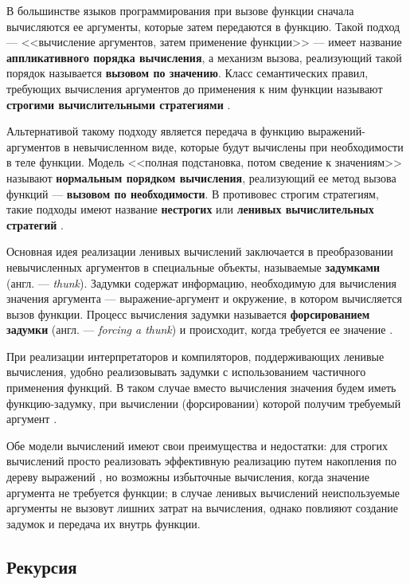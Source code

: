 В большинстве языков программирования при вызове функции сначала вычисляются
ее аргументы, которые затем передаются в функцию. Такой подход
--- <<вычисление аргументов, затем применение функции>> ---
имеет название \textbf{аппликативного порядка вычисления}, а механизм вызова,
реализующий такой порядок называется \textbf{вызовом по значению}. Класс
семантических правил, требующих вычисления аргументов до применения к ним
функции называют \textbf{строгими вычислительными стратегиями} \cite[с.~71]{fp93}.

Альтернативой такому подходу является передача в функцию выражений-аргументов
в невычисленном виде, которые будут вычислены при необходимости в теле
функции. Модель <<полная подстановка, потом сведение к значениям>> называют
\textbf{нормальным порядком вычисления}, реализующий ее метод вызова функций
--- \textbf{вызовом по необходимости}. В противовес строгим стратегиям,
такие подходы имеют название \textbf{нестрогих} или \textbf{ленивых вычислительных
стратегий} \cite[с.~32]{sicp}\cite[с.~370]{sicp}.

Основная идея реализации ленивых вычислений заключается в преобразовании
невычисленных аргументов в специальные объекты, называемые \textbf{задумками}
(англ. --- \textit{thunk}). Задумки содержат информацию, необходимую для
вычисления значения аргумента --- выражение-аргумент и окружение, в котором
вычисляется вызов функции. Процесс вычисления задумки называется
\textbf{форсированием задумки} (англ. --- \textit{forcing a thunk}) и происходит, когда требуется ее значение \cite[с.~372]{sicp}.

При реализации интерпретаторов и компиляторов, поддерживающих ленивые вычисления,
удобно реализовывать задумки с использованием частичного применения функций.
В таком случае вместо вычисления значения будем иметь функцию-задумку,
при вычислении (форсировании) которой получим требуемый аргумент \cite[с.~375]{sicp}.

Обе модели вычислений имеют свои преимущества и недостатки: для строгих
вычислений просто реализовать эффективную реализацию путем накопления по
дереву выражений \cite[с.~29]{sicp}, но возможны избыточные вычисления,
когда значение аргумента не требуется функции; в случае ленивых вычислений
неиспользуемые аргументы не вызовут лишних затрат на вычисления, однако
повлияют создание задумок и передача их внутрь функции.

\subsection{Рекурсия}\label{sec:ch1/sec3/subsec5}


